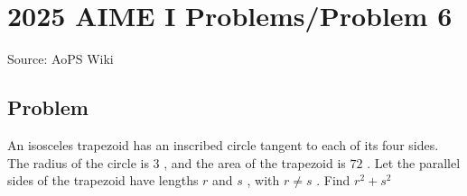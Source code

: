 \documentclass[12pt]{article}
\begin{document}
\section*{{2025 AIME I Problems/Problem 6}}
Source: AoPS Wiki

\subsection*{Problem}
An isosceles trapezoid has an inscribed circle tangent to each of its four sides. The radius of the circle is $3$ , and the area of the trapezoid is $72$ . Let the parallel sides of the trapezoid have lengths $r$ and $s$ , with $r \neq s$ . Find $r^2+s^2$
\end{document}
